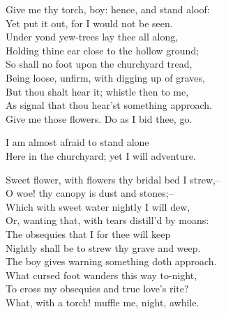 \begin{speech}
Give me thy torch, boy: hence, and stand aloof: \\

Yet put it out, for I would not be seen. \\
Under yond yew-trees lay thee all along, \\
Holding thine ear close to the hollow ground; \\
So shall no foot upon the churchyard tread, \\
Being loose, unfirm, with digging   up   of graves, \\
But thou shalt hear it; whistle then to me, \\
As signal that thou hear'st something approach. \\
Give me those flowers. Do as I bid thee, go. \\
\end{speech}
\begin{speech}
 I am almost afraid to stand alone
\\
Here in the churchyard; yet I will adventure. 
\\
\end{speech}
\begin{speech}
Sweet flower, with flowers thy bridal bed I strew,--
\\
O woe! thy canopy is dust and stones;-- \\
Which with sweet water nightly I will dew, \\
Or, wanting that, with tears distill'd by moans: \\
The obsequies that I for thee will keep \\
Nightly shall be to strew thy grave and weep. 
\\
The boy gives warning something doth approach. \\
What cursed foot wanders this way to-night, \\
To cross my obsequies and true love's rite? \\
What, with a torch! muffle me, night, awhile. 
\\
\end{speech}
